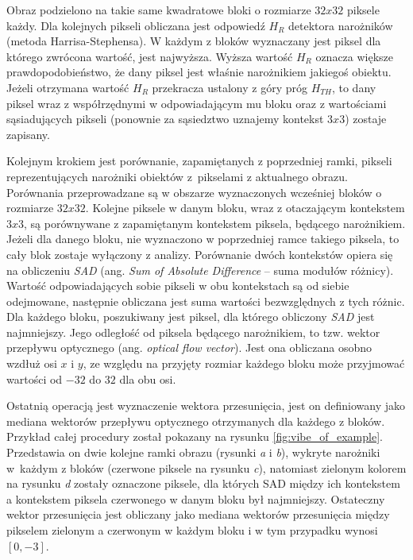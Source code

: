 Obraz podzielono na takie same kwadratowe bloki o rozmiarze $32x32$ piksele każdy. Dla kolejnych pikseli obliczana jest odpowiedź $H_R$ detektora narożników (metoda Harrisa-Stephensa). %
W każdym z bloków wyznaczany jest piksel dla którego zwrócona wartość, jest najwyższa. Wyższa wartość $H_R$ oznacza większe prawdopodobieństwo, że dany piksel jest właśnie narożnikiem jakiegoś obiektu. Jeżeli otrzymana wartość $H_R$ przekracza ustalony z góry próg $H_{TH}$, to dany piksel wraz z współrzędnymi w odpowiadającym mu bloku oraz z wartościami sąsiadujących pikseli (ponownie za sąsiedztwo uznajemy kontekst $3x3$) zostaje zapisany.

Kolejnym krokiem jest porównanie, zapamiętanych z poprzedniej ramki, pikseli reprezentujących narożniki obiektów z~pikselami z aktualnego obrazu. Porównania przeprowadzane są w obszarze wyznaczonych wcześniej bloków o rozmiarze $32x32$. Kolejne piksele w danym bloku, wraz z otaczającym kontekstem $3x3$, są porównywane z zapamiętanym kontekstem piksela, będącego narożnikiem. Jeżeli dla danego bloku, nie wyznaczono w poprzedniej ramce takiego piksela, to cały blok zostaje wyłączony z analizy. Porównanie dwóch kontekstów opiera się na obliczeniu \textit{SAD} (ang. \textit{Sum of Absolute Difference} -- suma modułów różnicy). Wartość odpowiadających sobie pikseli w obu kontekstach są od siebie odejmowane, następnie obliczana jest suma wartości bezwzględnych z tych różnic. Dla każdego bloku, poszukiwany jest piksel, dla którego obliczony \textit{SAD} jest najmniejszy. Jego odległość od piksela będącego narożnikiem, to tzw. wektor przepływu optycznego (ang. \textit{optical flow vector}). %
Jest ona obliczana osobno wzdłuż osi $x$ i $y$, ze względu na przyjęty rozmiar każdego bloku może przyjmować wartości od $-32$ do $32$ dla obu osi.

Ostatnią operacją jest wyznaczenie wektora przesunięcia, jest on definiowany jako mediana wektorów przepływu optycznego otrzymanych dla każdego z bloków. 
Przykład całej procedury został pokazany na rysunku \ref{fig:vibe_of_example}. 
Przedstawia on dwie kolejne ramki obrazu (rysunki \textit{a} i \textit{b}), wykryte narożniki w~każdym z bloków (czerwone piksele na rysunku \textit{c}), natomiast zielonym kolorem na rysunku \textit{d} zostały oznaczone piksele, dla których SAD między ich kontekstem a kontekstem piksela czerwonego w danym bloku był najmniejszy. 
Ostateczny wektor przesunięcia jest obliczany jako mediana wektorów przesunięcia między pikselem zielonym a czerwonym w każdym bloku i w tym przypadku wynosi $[0,-3]$.

